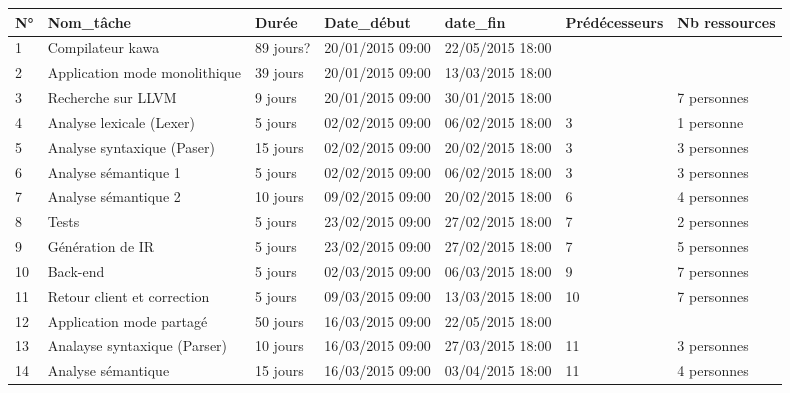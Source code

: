 \begin{table}[h]
\begin{tabular}{|l|l|l|l|l|l|l|}
\hline
\rowcolor[HTML]{0000FF} 
{\color[HTML]{FFFFFF} \textbf{N°}} & {\color[HTML]{FFFFFF} \textbf{Nom\_tâche}} & {\color[HTML]{FFFFFF} \textbf{Durée}} & {\color[HTML]{FFFFFF} \textbf{Date\_début}} & {\color[HTML]{FFFFFF} \textbf{date\_fin}} & {\color[HTML]{FFFFFF} \textbf{Prédécesseurs}} & {\color[HTML]{FFFFFF} \textbf{Nb ressources}} \\ \hline
1 & Compilateur kawa & 89 jours? & 20/01/2015 09:00 & 22/05/2015 18:00 &  &  \\ \hline
2 & Application mode monolithique & 39 jours & 20/01/2015 09:00 & 13/03/2015 18:00 &  &  \\ \hline
3 & Recherche sur LLVM & 9 jours & 20/01/2015 09:00 & 30/01/2015 18:00 &  & 7 personnes \\ \hline
4 & Analyse lexicale (Lexer) & 5 jours & 02/02/2015 09:00 & 06/02/2015 18:00 & 3 & 1 personne \\ \hline
5 & Analyse syntaxique (Paser) & 15 jours & 02/02/2015 09:00 & 20/02/2015 18:00 & 3 & 3 personnes \\ \hline
6 & Analyse sémantique 1 & 5 jours & 02/02/2015 09:00 & 06/02/2015 18:00 & 3 & 3 personnes \\ \hline
7 & Analyse sémantique 2 & 10 jours & 09/02/2015 09:00 & 20/02/2015 18:00 & 6 & 4 personnes \\ \hline
8 & Tests & 5 jours & 23/02/2015 09:00 & 27/02/2015 18:00 & 7 & 2 personnes \\ \hline
9 & Génération de IR & 5 jours & 23/02/2015 09:00 & 27/02/2015 18:00 & 7 & 5 personnes \\ \hline
10 & Back-end & 5 jours & 02/03/2015 09:00 & 06/03/2015 18:00 & 9 & 7 personnes \\ \hline
11 & Retour client et correction & 5 jours & 09/03/2015 09:00 & 13/03/2015 18:00 & 10 & 7 personnes \\ \hline
12 & Application mode partagé & 50 jours & 16/03/2015 09:00 & 22/05/2015 18:00 &  &  \\ \hline
13 & Analayse syntaxique (Parser) & 10 jours & 16/03/2015 09:00 & 27/03/2015 18:00 & 11 & 3 personnes \\ \hline
14 & Analyse sémantique & 15 jours & 16/03/2015 09:00 & 03/04/2015 18:00 & 11 & 4 personnes \\ \hline

\end{tabular}
\end{table}
